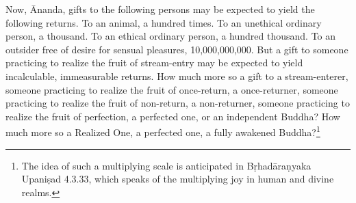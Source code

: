 \documentclass[12pt,openany]{book}%
\begin{document}
Now, Ānanda, gifts to the following persons may be expected to yield the following returns. To an animal, a hundred times. To an unethical ordinary person, a thousand. To an ethical ordinary person, a hundred thousand. To an outsider free of desire for sensual pleasures, 10,000,000,000. But a gift to someone practicing to realize the fruit of stream-entry may be expected to yield incalculable, immeasurable returns. How much more so a gift to a stream-enterer, someone practicing to realize the fruit of once-return, a once-returner, someone practicing to realize the fruit of non-return, a non-returner, someone practicing to realize the fruit of perfection, a perfected one, or an independent Buddha? How much more so a Realized One, a perfected one, a fully awakened Buddha?\footnote{The idea of such a multiplying scale is anticipated in \textsanskrit{Bṛhadāraṇyaka} \textsanskrit{Upaniṣad} 4.3.33, which speaks of the multiplying joy in human and divine realms. } 
\end{document}
